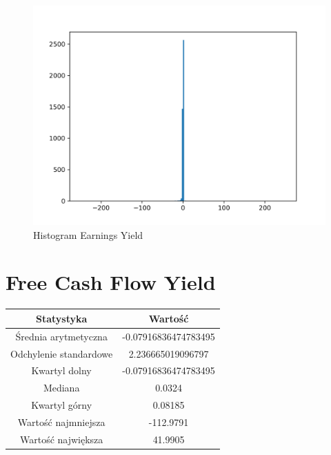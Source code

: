 \documentclass{article}
\begin{document}
\begin{figure}[h!]
    \includegraphics[width=\linewidth]{variables/Earnings Yield.png}
    \caption{Histogram Earnings Yield }
\end{figure}\section{ Free Cash Flow Yield }

\begin{center}
    \begin{tabular}{|c | c|} 
    \hline
    Statystyka & Wartość \\
    \hline\hline
    Średnia arytmetyczna & -0.07916836474783495 \\ 
    \hline
    Odchylenie standardowe & 2.236665019096797 \\
    \hline
    Kwartyl dolny & -0.07916836474783495 \\
    \hline
    Mediana & 0.0324 \\
    \hline
    Kwartyl górny & 0.08185 \\
    \hline
    Wartość najmniejsza & -112.9791 \\
    \hline
    Wartość największa & 41.9905 \\
    \hline
   \end{tabular}
\end{center}
\end{document}
